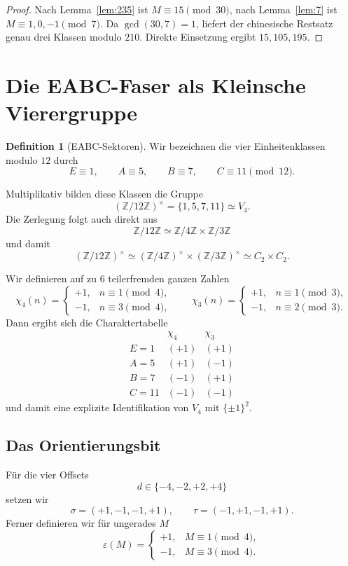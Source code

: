 \documentclass[11pt,a4paper]{article}
\theoremstyle{definition}
\newtheorem{definition}[satz]{Definition}
\theoremstyle{remark}
\newcommand{\Z}{\mathbb Z}
\newcommand{\eps}{\varepsilon}
\begin{document}
\begin{proof}
Nach Lemma~\ref{lem:235} ist $M\equiv15\pmod{30}$, nach Lemma~\ref{lem:7} ist $M\equiv1,0,-1\pmod7$. Da $\gcd(30,7)=1$, liefert der chinesische Restsatz genau drei Klassen modulo $210$. Direkte Einsetzung ergibt $15,105,195$.
\end{proof}

\section{Die EABC-Faser als Kleinsche Vierergruppe}

\begin{definition}[EABC-Sektoren]
Wir bezeichnen die vier Einheitenklassen modulo $12$ durch
\[
E\equiv1,\qquad A\equiv5,\qquad B\equiv7,\qquad C\equiv11\pmod{12}.
\]
\end{definition}

Multiplikativ bilden diese Klassen die Gruppe
\[
(\Z/12\Z)^\times=\{1,5,7,11\}\simeq V_4.
\]
Die Zerlegung folgt auch direkt aus
\[
\Z/12\Z\simeq \Z/4\Z\times\Z/3\Z
\]
und damit
\[
(\Z/12\Z)^\times\simeq(\Z/4\Z)^\times\times(\Z/3\Z)^\times\simeq C_2\times C_2.
\]

Wir definieren auf zu $6$ teilerfremden ganzen Zahlen
\[
\chi_4(n)=
\begin{cases}
+1,&n\equiv1\pmod4,\\
-1,&n\equiv3\pmod4,
\end{cases}
\qquad
\chi_3(n)=
\begin{cases}
+1,&n\equiv1\pmod3,\\
-1,&n\equiv2\pmod3.
\end{cases}
\]
Dann ergibt sich die Charaktertabelle
\begin{equation}\label{eq:char-table}
\begin{array}{c|cc}
 &\chi_4&\chi_3\\ \hline
E=1 &(+1)&(+1)\\
A=5 &(+1)&(-1)\\
B=7 &(-1)&(+1)\\
C=11&(-1)&(-1)
\end{array}
\end{equation}
und damit eine explizite Identifikation von $V_4$ mit $\{\pm1\}^2$.

\subsection{Das Orientierungsbit}

Für die vier Offsets
\[
d\in\{-4,-2,+2,+4\}
\]
setzen wir
\[
\sigma=(+1,-1,-1,+1),\qquad
\tau=(-1,+1,-1,+1).
\]
Ferner definieren wir für ungerades $M$
\[
\eps(M)=
\begin{cases}
+1,&M\equiv1\pmod4,\\
-1,&M\equiv3\pmod4.
\end{cases}
\]
\end{document}
